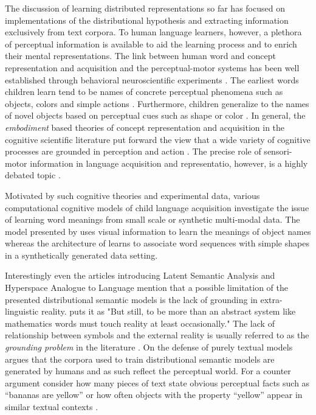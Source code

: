The discussion of learning distributed representations so far has focused on
implementations of the distributional hypothesis and extracting information exclusively
from text corpora. To human language learners, however, a plethora of
perceptual information is available to aid the
learning process and to enrich their mental representations.
The link between human word and concept representation
and acquisition and the perceptual-motor systems has been well established through behavioral
neuroscientific experiments \citep{pulvermuller2005brain}.
The earliest words children learn tend to be names of concrete perceptual phenomena
such as objects, colors and simple actions \citep{bornstein2004cross}. Furthermore, children generalize to
the names of novel objects based on perceptual cues such as shape or color \citep{landau1998object}.
In general, the \emph{embodiment} based theories of concept representation and acquisition in the
cognitive scientific literature put forward the view that a wide variety of cognitive processes
are grounded in perception and action \citep{meteyard2008role}. The precise role of
sensori-motor information in language acquisition and representatio, however, is a highly
debated topic \citep{meteyard2012coming}.

Motivated by such cognitive theories and experimental data,
various computational cognitive models of child
language acquisition investigate the issue
of learning word meanings from small scale or synthetic multi-modal data. The model presented by
\cite{yu2005emergence} uses visual information to learn the meanings of object
names whereas the architecture of \cite{roy2002learning} learns to associate word sequences
with simple shapes in a synthetically generated data setting.

Interestingly even the articles introducing Latent Semantic Analysis
\citep{landauer1997solution} and Hyperspace Analogue to Language \citep{lund1996producing} mention
that a possible limitation of the presented distributional semantic models is the lack of
grounding in extra-linguistic reality. \cite{landauer1997solution} puts it as "But still, to be more than
an abstract system like mathematics words must touch reality at least occasionally."
The lack of relationship between symbols and the external reality is usually referred
to as the \emph{grounding problem} in the literature \citep{harnad1990symbol,perfetti1998limits}.
On the defense of purely textual models \cite{louwerse2011symbol} argues that the corpora
used to train distributional semantic models are generated by humans and as such reflect the perceptual world.
For a counter argument consider how many pieces of text state obvious perceptual
facts such as ``bananas are yellow'' or  how often objects with the property ``yellow''
appear in similar textual contexts \citep{bruni2014multimodal}.

